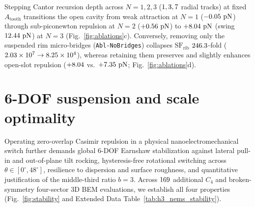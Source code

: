 \documentclass[pdflatex,sn-nature]{sn-jnl}
\begin{document}
Stepping Cantor recursion depth across $N = 1, 2, 3$ ($1{}, 3{}, 7{}$ radial tracks) at fixed $A_{\mathrm{tooth}}$ transitions the open cavity from weak attraction at $N=1$ ($-0.05{}\ \mathrm{pN}$) through sub-piconewton repulsion at $N=2$ ($+0.56{}\ \mathrm{pN}$) to $\AblDepthNthreeFzOpen{}\ \mathrm{pN}$ (swing $12.44{}\ \mathrm{pN}$) at $N=3$ (Fig.~\ref{fig:ablations}c). Conversely, removing only the suspended rim micro-bridges (\texttt{Abl-NoBridges}) collapses $\mathrm{SF}_{\mathrm{rib}}$ $246.3{}$-fold ($2.03\times 10^{7}{} \to 8.25\times 10^{4}{}$), whereas retaining them preserves and slightly enhances open-slot repulsion ($+8.04{}$ vs.\ $+7.35{}\ \mathrm{pN}$; Fig.~\ref{fig:ablations}d).

\section*{6-DOF suspension and scale optimality}
\label{sec:stability}

Operating zero-overlap Casimir repulsion in a physical nanoelectromechanical switch further demands global 6-DOF Earnshaw stabilization against lateral pull-in and out-of-plane tilt rocking\cite{levin2010,rodriguez2011}, hysteresis-free rotational switching across $\theta \in [0^\circ, 48^\circ]$, resilience to dispersion and surface roughness, and quantitative justification of the middle-third ratio $b=3$. Across $169{}$ additional $C_4$ and broken-symmetry four-sector 3D BEM evaluations, we establish all four properties (Fig.~\ref{fig:stability} and Extended Data Table~\ref{tab:h3_nems_stability}).
\end{document}
